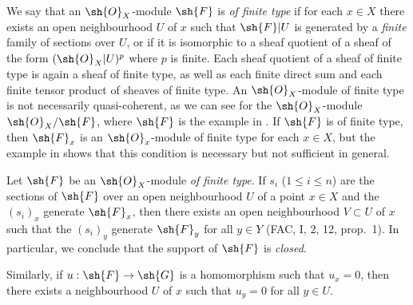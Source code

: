 \begin{env}[5.2.1]
\label{0.5.2.1}
We say that an $\sh{O}_X$-module $\sh{F}$ is \emph{of finite type} if for each $x\in X$ there exists an open neighbourhood $U$ of $x$ such that $\sh{F}|U$ is generated by a \emph{finite} family of sections over $U$, or if it is isomorphic to a sheaf quotient of a sheaf of the form $(\sh{O}_X|U)^p$ where $p$ is finite.
Each sheaf quotient of a sheaf of finite type is again a sheaf of finite type, as well as each finite direct sum and each finite tensor product of sheaves of finite type.
An $\sh{O}_X$-module of finite type is not necessarily quasi-coherent, as we can see for the $\sh{O}_X$-module $\sh{O}_X/\sh{F}$, where $\sh{F}$ is the example in .
If $\sh{F}$ is of finite type, then $\sh{F}_x$ is an $\sh{O}_x$-module of finite type for each $x\in X$, but the example in  shows that this condition is necessary but not sufficient in general.
\end{env}

\begin{env}[5.2.2]
\label{0.5.2.2}
Let $\sh{F}$ be an $\sh{O}_X$-module \emph{of finite type}.
If $s_i$ ($1\leq i\leq n$) are the sections of $\sh{F}$ over an open neighbourhood $U$ of a point $x\in X$ and the $(s_i)_x$ generate $\sh{F}_x$, then there exists an open neighbourhood $V\subset U$ of $x$ such that the $(s_i)_y$ generate $\sh{F}_y$ for all $y\in Y$ (FAC, I, 2, 12, prop.~1).
In particular, we conclude that the support of $\sh{F}$ is \emph{closed}.

Similarly, if $u:\sh{F}\to\sh{G}$ is a homomorphism such that $u_x=0$, then there exists a neighbourhood $U$ of $x$ such that $u_y=0$ for all $y\in U$.
\end{env}

